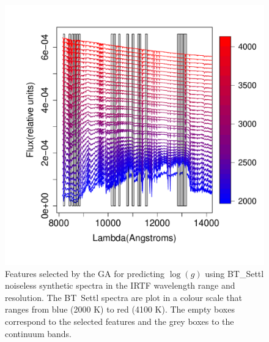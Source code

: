 \begin {figure}
 \centering
  \includegraphics[scale=0.55]{figs/BT-spectraAtIRTF-Inf-logg}
  \caption{Features selected by the GA for predicting $\log(g)$ using
    BT\_Settl noiseless synthetic spectra in the IRTF wavelength range
    and resolution. The BT\ Settl spectra are plot in a colour scale
    that ranges from blue (2000 K) to red (4100 K). The empty boxes
    correspond to the selected features and the grey boxes to the
    continuum bands.}
\label{fig:irtf-logg-inf}
\end {figure}


